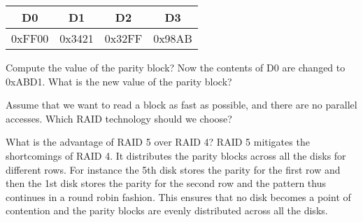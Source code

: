 \begin{ExerciseList}
\vskip 4mm

\begin{center}
\begin{tabular}{|c|c|c|c|}
 \hline
 D0 & D1 & D2 & D3 \\
 \hline
0xFF00 & 0x3421 & 0x32FF & 0x98AB \\
 \hline
\end{tabular}
\end{center}

\vskip 4mm

Compute the value of the parity block?
Now the contents of D0 are changed to 0xABD1.
What is the new value of the parity block? 

\Exercise
Assume that we want to read a block as fast as possible, and there are no parallel accesses. Which RAID technology
should we choose?

\Exercise
What is the advantage of RAID 5 over RAID 4? 
\Answer
RAID 5 mitigates the shortcomings of RAID 4. It distributes the parity blocks across all the disks for different rows. For instance the 5th disk stores the parity for the first row and then the 1st disk stores the parity for the second row and the pattern thus continues in a round robin fashion. This ensures that no disk becomes a point of contention and the parity blocks are evenly distributed across all the disks.
\end{ExerciseList}

